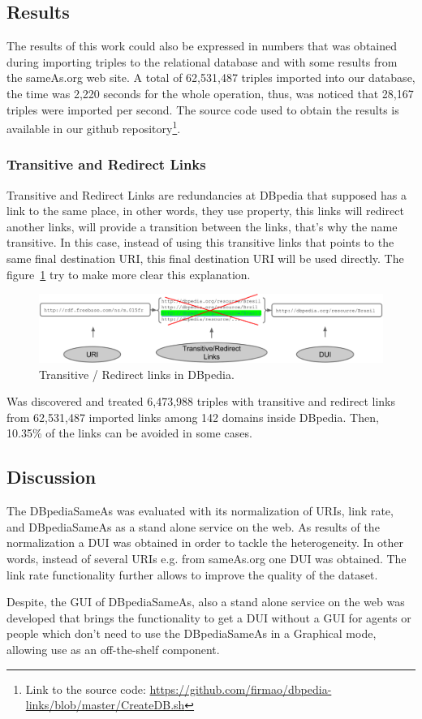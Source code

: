 \subsection{Results}
The results of this work could also be expressed in numbers that was obtained during importing triples to the relational database and with some results from the sameAs.org web site.
A total of 62,531,487 triples imported into our database, the time was 2,220 seconds for the whole operation, thus, was noticed that 28,167 triples were imported per second.
The source code used to obtain the results is available in our github repository\footnote{Link to the source code: \url{https://github.com/firmao/dbpedia-links/blob/master/CreateDB.sh}}.

\subsubsection{Transitive and Redirect Links}
Transitive and Redirect Links are redundancies at DBpedia that supposed has a link to the same place, in other words, they use  property, this links will redirect another links, will provide a transition between the links, that's why the name transitive.
In this case, instead of using this transitive links that points to the same final destination URI, this final destination URI will be used directly. The figure~\ref{fig:transient} try to make more clear this explanation.

\begin{figure}[hbt] 
  	\centering
	\includegraphics[width=\textwidth]{img/transient.png}
  	\caption{Transitive / Redirect links in DBpedia.}
  	\label{fig:transient}
\end{figure}

Was discovered and treated 6,473,988 triples with transitive and redirect links from 62,531,487 imported links among 142 domains inside DBpedia. Then, 10.35\% of the links can be avoided in some cases. 

\subsection{Discussion}
The DBpediaSameAs was evaluated with its normalization of URIs, link rate, and DBpediaSameAs as a stand alone service on the web.
As results of the normalization a DUI was obtained in order to tackle the heterogeneity. In other words, instead of several URIs  e.g. from sameAs.org one DUI was obtained.
The link rate functionality further allows to improve the quality of the dataset.

Despite, the GUI of DBpediaSameAs, also a stand alone service on the web was developed that brings the functionality to get a DUI without a GUI for agents or people which don't need to use the DBpediaSameAs in a Graphical mode, allowing use as an off-the-shelf component.

